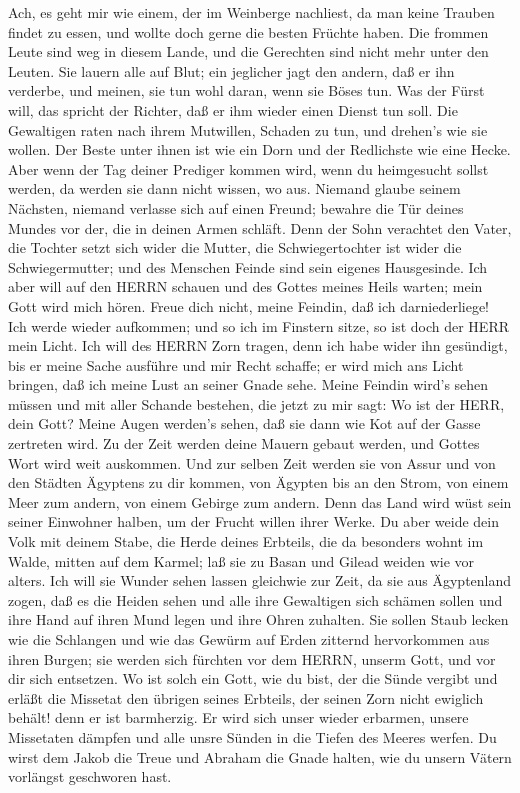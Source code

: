  Ach, es geht mir wie einem, der im Weinberge nachliest, da
man keine Trauben findet zu essen, und wollte doch gerne die besten
Früchte haben.  Die frommen Leute sind weg in diesem Lande,
und die Gerechten sind nicht mehr unter den Leuten. Sie lauern alle auf
Blut; ein jeglicher jagt den andern, daß er ihn verderbe, 
und meinen, sie tun wohl daran, wenn sie Böses tun. Was der Fürst will,
das spricht der Richter, daß er ihm wieder einen Dienst tun soll. Die
Gewaltigen raten nach ihrem Mutwillen, Schaden zu tun, und drehen's wie
sie wollen.  Der Beste unter ihnen ist wie ein Dorn und der
Redlichste wie eine Hecke. Aber wenn der Tag deiner Prediger kommen
wird, wenn du heimgesucht sollst werden, da werden sie dann nicht
wissen, wo aus.  Niemand glaube seinem Nächsten, niemand
verlasse sich auf einen Freund; bewahre die Tür deines Mundes vor der,
die in deinen Armen schläft.  Denn der Sohn verachtet den
Vater, die Tochter setzt sich wider die Mutter, die Schwiegertochter ist
wider die Schwiegermutter; und des Menschen Feinde sind sein eigenes
Hausgesinde.  Ich aber will auf den HERRN schauen und des
Gottes meines Heils warten; mein Gott wird mich hören. 
Freue dich nicht, meine Feindin, daß ich darniederliege! Ich werde
wieder aufkommen; und so ich im Finstern sitze, so ist doch der HERR
mein Licht.  Ich will des HERRN Zorn tragen, denn ich habe
wider ihn gesündigt, bis er meine Sache ausführe und mir Recht schaffe;
er wird mich ans Licht bringen, daß ich meine Lust an seiner Gnade sehe.
 Meine Feindin wird's sehen müssen und mit aller Schande
bestehen, die jetzt zu mir sagt: Wo ist der HERR, dein Gott? Meine Augen
werden's sehen, daß sie dann wie Kot auf der Gasse zertreten wird.
 Zu der Zeit werden deine Mauern gebaut werden, und Gottes
Wort wird weit auskommen.  Und zur selben Zeit werden sie
von Assur und von den Städten Ägyptens zu dir kommen, von Ägypten bis an
den Strom, von einem Meer zum andern, von einem Gebirge zum andern.
 Denn das Land wird wüst sein seiner Einwohner halben, um
der Frucht willen ihrer Werke.  Du aber weide dein Volk mit
deinem Stabe, die Herde deines Erbteils, die da besonders wohnt im
Walde, mitten auf dem Karmel; laß sie zu Basan und Gilead weiden wie vor
alters.  Ich will sie Wunder sehen lassen gleichwie zur
Zeit, da sie aus Ägyptenland zogen,  daß es die Heiden
sehen und alle ihre Gewaltigen sich schämen sollen und ihre Hand auf
ihren Mund legen und ihre Ohren zuhalten.  Sie sollen Staub
lecken wie die Schlangen und wie das Gewürm auf Erden zitternd
hervorkommen aus ihren Burgen; sie werden sich fürchten vor dem HERRN,
unserm Gott, und vor dir sich entsetzen.  Wo ist solch ein
Gott, wie du bist, der die Sünde vergibt und erläßt die Missetat den
übrigen seines Erbteils, der seinen Zorn nicht ewiglich behält! denn er
ist barmherzig.  Er wird sich unser wieder erbarmen, unsere
Missetaten dämpfen und alle unsre Sünden in die Tiefen des Meeres
werfen.  Du wirst dem Jakob die Treue und Abraham die Gnade
halten, wie du unsern Vätern vorlängst geschworen hast.
